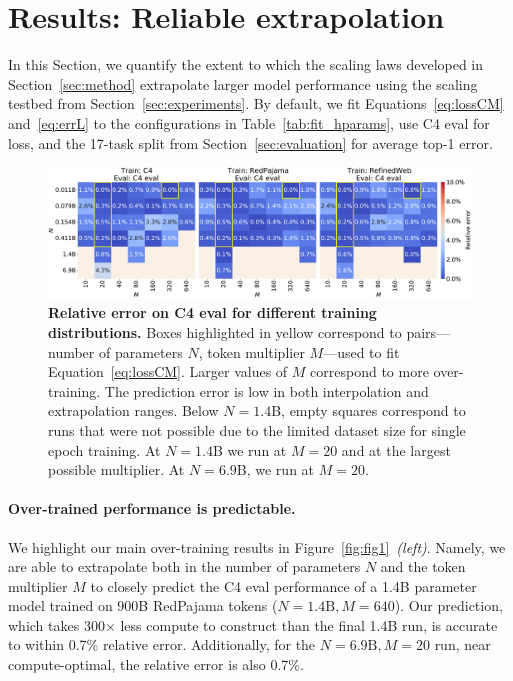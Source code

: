 \section{Results: Reliable extrapolation}
\label{sec:results}

In this Section, we quantify the extent to which the scaling laws developed in Section~\ref{sec:method} extrapolate larger model performance using the scaling testbed from Section~\ref{sec:experiments}.
By default, we fit Equations~\eqref{eq:lossCM} and~\eqref{eq:errL} to the configurations in Table~\ref{tab:fit_hparams}, use C4 eval for loss, and the 17-task split from Section~\ref{sec:evaluation} for average top-1 error.
\begin{figure}[tp]
    \centering
    \includegraphics[width=\linewidth]{figs/error.pdf}
    \caption{\textbf{Relative error on C4 eval for different training distributions.} Boxes highlighted in yellow correspond to pairs---number of parameters $N$, token multiplier $M$---used to fit Equation~\eqref{eq:lossCM}. Larger values of $M$ correspond to more over-training. The prediction error is low in both interpolation and extrapolation ranges. Below $N=1.4$B, empty squares correspond to runs that were not possible due to the limited dataset size for single epoch training. At $N=1.4$B we run at $M=20$ and at the largest possible multiplier. At $N=6.9$B, we run at $M=20$.}
    \label{fig:error}
\end{figure}

\paragraph{Over-trained performance is predictable.}
We highlight our main over-training results in Figure~\ref{fig:fig1}~\emph{(left)}.
Namely, we are able to extrapolate both in the number of parameters $N$ and the token multiplier $M$ to closely predict the C4 eval performance of a 1.4B parameter model trained on 900B RedPajama tokens ($N=1.4\text{B}, M=640$).
Our prediction, which takes 300$\times$ less compute to construct than the final 1.4B run, is accurate to within 0.7\% relative error.
Additionally, for the $N=6.9\text{B}, M=20$ run, near compute-optimal, the relative error is also 0.7\%.

